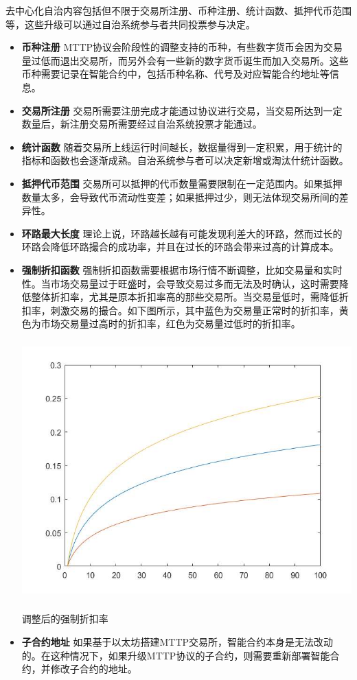 \documentclass[UTF8,nofonts]{ctexart}
\makeatletter
\newenvironment{figurehere}
  {\def\@captype{figure}}
  {}
\makeatother
\begin{document}
去中心化自治内容包括但不限于交易所注册、币种注册、统计函数、抵押代币范围等，这些升级可以通过自治系统参与者共同投票参与决定。
  \begin{itemize}
    \item \textbf{币种注册} MTTP协议会阶段性的调整支持的币种，有些数字货币会因为交易量过低而退出交易所，而另外会有一些新的数字货币诞生而加入交易所。这些币种需要记录在智能合约中，包括币种名称、代号及对应智能合约地址等信息。
    \item \textbf{交易所注册} 交易所需要注册完成才能通过协议进行交易，当交易所达到一定数量后，新注册交易所需要经过自治系统投票才能通过。
    \item \textbf{统计函数} 随着交易所上线运行时间越长，数据量得到一定积累，用于统计的指标和函数也会逐渐成熟。自治系统参与者可以决定新增或淘汰什统计函数。
    \item \textbf{抵押代币范围} 交易所可以抵押的代币数量需要限制在一定范围内。如果抵押数量太多，会导致代币流动性变差；如果抵押过少，则无法体现交易所间的差异性。
    \item \textbf{环路最大长度} 理论上说，环路越长越有可能发现利差大的环路，然而过长的环路会降低环路撮合的成功率，并且在过长的环路会带来过高的计算成本。
    \item \textbf{强制折扣函数} 强制折扣函数需要根据市场行情不断调整，比如交易量和实时性。当市场交易量过于旺盛时，会导致交易过多而无法及时确认，这时需要降低整体折扣率，尤其是原本折扣率高的那些交易所。当交易量低时，需降低折扣率，刺激交易的撮合。如下图所示，其中蓝色为交易量正常时的折扣率，黄色为市场交易量过高时的折扣率，红色为交易量过低时的折扣率。
\begin{center}
\begin{figurehere}
\includegraphics[height=10cm]{images/rate_adjust.jpg}
\caption{调整后的强制折扣率}
\label{fig:dischargeRateAdjust}
\end{figurehere}
\end{center}

    \item \textbf{子合约地址} 如果基于以太坊搭建MTTP交易所，智能合约本身是无法改动的。在这种情况下，如果升级MTTP协议的子合约，则需要重新部署智能合约，并修改子合约的地址。
  \end{itemize}
\end{document}
